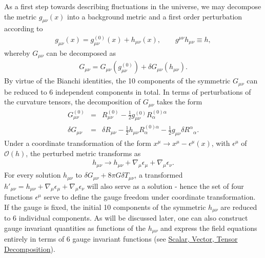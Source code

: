 \documentclass[10pt,letterpaper]{article}
\numberwithin{equation}{section}
\begin{document}
\indent As a first step towards describing fluctuations in the universe, we may decompose the metric $g_{\mu\nu}(x)$ into a background metric and a first order perturbation according to
\begin{eqnarray}
g_{\mu\nu}(x) = g_{\mu\nu}^{(0)}(x) + h_{\mu\nu}(x),\qquad g^{\mu\nu}h_{\mu\nu} \equiv h,
\end{eqnarray}
whereby $G_{\mu\nu}$ can be decomposed as
\begin{eqnarray}
G_{\mu\nu} = G_{\mu\nu}(g_{\mu\nu}^{(0)}) + \delta G_{\mu\nu}(h_{\mu\nu}).
\end{eqnarray}
By virtue of the Bianchi identities, the 10 components of the symmetric $G_{\mu\nu}$ can be reduced to 6 independent components in total. In terms of perturbations of the curvature tensors, the decomposition of $G_{\mu\nu}$ takes the form
\begin{eqnarray}
G_{\mu\nu}^{(0)} &=& R_{\mu\nu}^{(0)} -\frac{1}{2} g_{\mu\nu}^{(0)} R_\alpha^{(0)\alpha}
\label{Einzero}
\\
\delta G_{\mu\nu} &=& \delta R_{\mu\nu} - \frac{1}{2} h_{\mu\nu} R_\alpha^{(0)\alpha} -\frac{1}{2}g_{\mu\nu}\delta R^\alpha{}_\alpha.
\label{Einone}
\end{eqnarray}
Under a coordinate transformation of the form $x^\mu \to x^\mu - \epsilon^\mu(x)$, with $\epsilon^\mu$ of $\mathcal O(h)$, the perturbed metric transforms as
\begin{eqnarray}
h_{\mu\nu} \to h_{\mu\nu} + \nabla_\mu \epsilon_\mu + \nabla_\mu \epsilon_\nu. 
\label{gaugeh}
\end{eqnarray}
For every solution $h_{\mu\nu}$ to $\delta G_{\mu\nu}+8\pi G \delta T_{\mu\nu}$, a transformed $h'_{\mu\nu}=h_{\mu\nu} + \nabla_\mu \epsilon_\mu + \nabla_\mu \epsilon_\nu$ will also serve as a solution - hence the set of four functions $\epsilon^\mu$ serve to define the gauge freedom under coordinate transformation. If the gauge is fixed, the initial 10 components of the symmetric $h_{\mu\nu}$ are reduced to 6 individual components. As will be discussed later, one can also construct gauge invariant quantities as functions of the $h_{\mu\nu}$ and express the field equations entirely in terms of 6 gauge invariant functions (see \hyperref[sec:Scalar, vector, Tensor Decomposition]{Scalar, Vector, Tensor Decomposition}).
\end{document}
